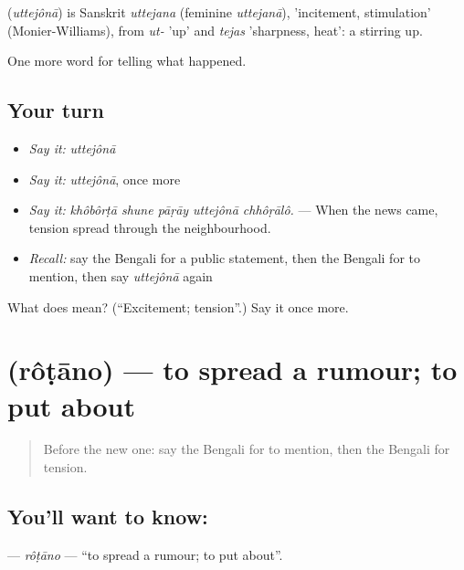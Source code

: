 \begin{cousinweb}
\textbf{} (\emph{uttejônā}) is Sanskrit \emph{uttejana} (feminine \emph{uttejanā}), 'incitement, stimulation' (Monier-Williams), from \emph{ut-} 'up' and \emph{tejas} 'sharpness, heat': a stirring up.
\end{cousinweb}

\begin{grammarlens}[title={What you've built}]
One more word for telling what happened.
\end{grammarlens}

\subsection*{Your turn}
\begin{itemize}
\raggedright
  \item \emph{Say it:} \emph{uttejônā}
  \item \emph{Say it:} \emph{uttejônā}, once more
  \item \emph{Say it:} \emph{khôbôrṭā shune pāṛāy uttejônā chhôṛālô.} — When the news came, tension spread through the neighbourhood.
  \item \emph{Recall:} say the Bengali for a public statement, then the Bengali for to mention, then say \emph{uttejônā} again
\end{itemize}

\begin{tcolorbox}[breakable,colback=teal!4,colframe=teal!35!black,title={Before you move on}]
What does  mean? (\textquotedblleft{}Excitement; tension\textquotedblright{}.) Say it once more.
\end{tcolorbox}
\section[\texorpdfstring{\bn{রটানো} (rôṭāno)}{রটানো (rôṭāno)}]{ (rôṭāno) — to spread a rumour; to put about}

\label{lesson:BN-C298-rotano}



\begin{quote}
Before the new one: say the Bengali for to mention, then the Bengali for tension.
\end{quote}

\subsection*{You'll want to know: }
\textbf{} — \emph{rôṭāno} — \textquotedblleft{}to spread a rumour; to put about\textquotedblright{}.


